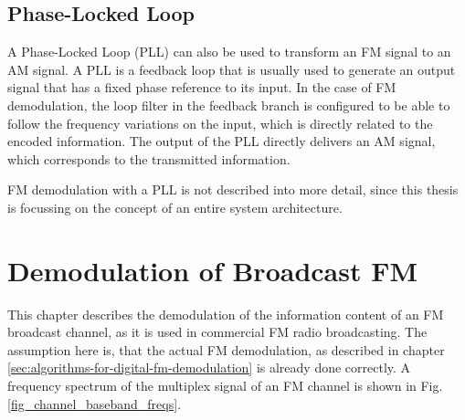 \subsection{Phase-Locked Loop}

A Phase-Locked Loop (PLL) can also be used to transform an FM signal to an AM signal.
A PLL is a feedback loop that is usually used to generate an output signal that has a fixed phase reference to its input.
In the case of FM demodulation, the loop filter in the feedback branch is configured to be able to follow the frequency variations on the input, which is directly related to the encoded information.
The output of the PLL directly delivers an AM signal, which corresponds to the transmitted information. \cite{SchnyderHaller2002}

FM demodulation with a PLL is not described into more detail, since this thesis is focussing on the concept of an entire system architecture.

\section{Demodulation of Broadcast FM}
\label{sec:demodulation-of-broadcast-fm}

This chapter describes the demodulation of the information content of an FM broadcast channel, as it is used in commercial FM radio broadcasting.
The assumption here is, that the actual FM demodulation, as described in chapter \ref{sec:algorithms-for-digital-fm-demodulation} is already done correctly.
A frequency spectrum of the multiplex signal of an FM channel is shown in Fig.\ref{fig_channel_baseband_freqs}.

